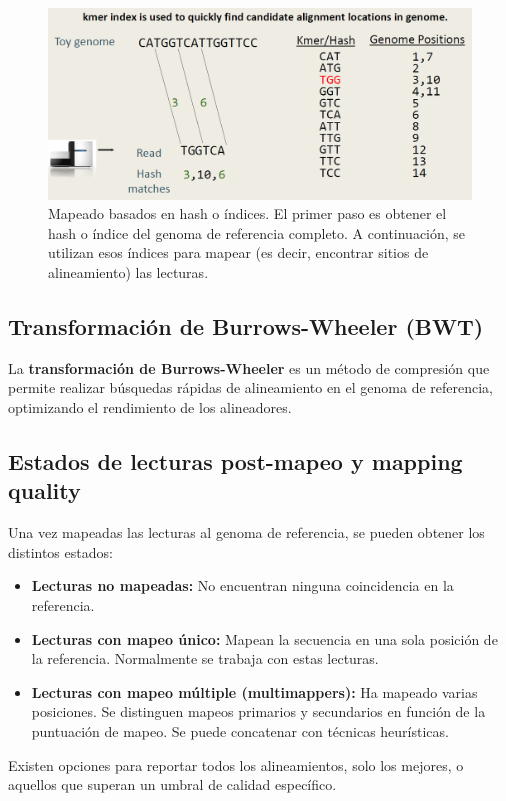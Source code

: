 \begin{figure}[htbp]
\centering
\includegraphics[width = \textwidth]{figs/hash-mapping.png}
\caption{Mapeado basados en hash o índices. El primer paso es obtener el hash o índice del genoma de referencia completo. A continuación, se utilizan esos índices para mapear (es decir, encontrar sitios de alineamiento) las lecturas.}
\end{figure}

\subsection{Transformación de Burrows-Wheeler (BWT)}
La \textbf{transformación de Burrows-Wheeler} es un método de compresión que permite realizar búsquedas rápidas de alineamiento en el genoma de referencia, optimizando el rendimiento de los alineadores.

\subsection{Estados de lecturas post-mapeo y mapping quality}
Una vez mapeadas las lecturas al genoma de referencia, se pueden obtener los distintos estados:
\begin{itemize}
\item \textbf{Lecturas no mapeadas:} No encuentran ninguna coincidencia en la referencia.
\item \textbf{Lecturas con mapeo único:} Mapean la secuencia en una sola posición de la referencia. Normalmente se trabaja con estas lecturas.
\item \textbf{Lecturas con mapeo múltiple (multimappers):} Ha mapeado varias posiciones. Se distinguen mapeos primarios y secundarios en función de la puntuación de mapeo. Se puede concatenar con técnicas heurísticas.
\end{itemize}

Existen opciones para reportar todos los alineamientos, solo los mejores, o aquellos que superan un umbral de calidad específico.

